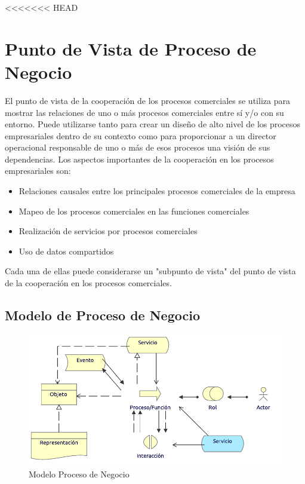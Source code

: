 <<<<<<< HEAD
\section{Punto de Vista de Proceso de Negocio}

El punto de vista de la cooperación de los procesos comerciales se utiliza para mostrar las relaciones de uno o más procesos comerciales entre sí y/o con su entorno. Puede utilizarse tanto para crear un diseño de alto nivel de los procesos empresariales dentro de su contexto como para proporcionar a un director operacional responsable de uno o más de esos procesos una visión de sus dependencias. Los aspectos importantes de la cooperación en los procesos empresariales son:

\begin{itemize}
	\item Relaciones causales entre los principales procesos comerciales de la empresa
	\item Mapeo de los procesos comerciales en las funciones comerciales
	\item Realización de servicios por procesos comerciales
	\item Uso de datos compartidos
\end{itemize}

Cada una de ellas puede considerarse un "subpunto de vista" del punto de vista de la cooperación en los procesos comerciales.

\subsection{Modelo de Proceso de Negocio}
\begin{figure}[h!]
	\centering
	\includegraphics[width=.8\linewidth]{imgs/modelo/ProcesoNegocio}
	\caption{Modelo Proceso de Negocio}
\end{figure}


